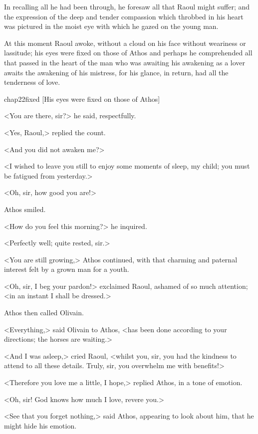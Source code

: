 In recalling all he had been through, he foresaw all that Raoul might suffer; and the expression of the deep and tender compassion which throbbed in his heart was pictured in the moist eye with which he gazed on the young man.

At this moment Raoul awoke, without a cloud on his face without weariness or lassitude; his eyes were fixed on those of Athos and perhaps he comprehended all that passed in the heart of the man who was awaiting his awakening as a lover awaits the awakening of his mistress, for his glance, in return, had all the tenderness of love.

\begin{bwbigpic}
	[\basicscale] 
	{chap22fixed}
	[His eyes were fixed on those of Athos]
\end{bwbigpic}

<You are there, sir?> he said, respectfully.

<Yes, Raoul,> replied the count.

<And you did not awaken me?>

<I wished to leave you still to enjoy some moments of sleep, my child; you must be fatigued from yesterday.>

<Oh, sir, how good you are!>

Athos smiled.

<How do you feel this morning?> he inquired.

<Perfectly well; quite rested, sir.>

<You are still growing,> Athos continued, with that charming and paternal interest felt by a grown man for a youth.

<Oh, sir, I beg your pardon!> exclaimed Raoul, ashamed of so much attention; <in an instant I shall be dressed.>

Athos then called Olivain.

<Everything,> said Olivain to Athos, <has been done according to your directions; the horses are waiting.>

<And I was asleep,> cried Raoul, <whilst you, sir, you had the kindness to attend to all these details. Truly, sir, you overwhelm me with benefits!>

<Therefore you love me a little, I hope,> replied Athos, in a tone of emotion.

<Oh, sir! God knows how much I love, revere you.>

<See that you forget nothing,> said Athos, appearing to look about him, that he might hide his emotion.

